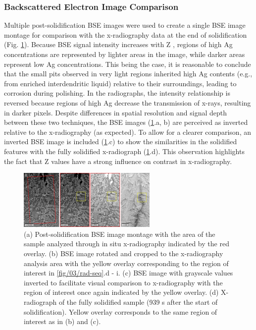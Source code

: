 \subsubsection{Backscattered Electron Image Comparison}
Multiple post-solidification BSE images were used to create a single BSE
image montage for comparison with the x-radiography data at the end of
solidification (Fig. \ref{fig/03/sem-rad}).
Because BSE signal intensity increases with Z \cite{Reuter2003},
regions of high Ag concentrations are represented by lighter areas in the
image, while darker areas represent low Ag concentrations. This being the
case, it is reasonable to conclude that the small pits observed in very
light regions inherited high Ag contents (e.g., from enriched
interdendritic liquid) relative to their surroundings, leading to
corrosion during polishing. In the radiographs, the intensity relationship
is reversed because regions of high Ag decrease the transmission of
x-rays, resulting in darker pixels. Despite differences in spatial
resolution and signal depth between these two techniques, the BSE images
(\ref{fig/03/sem-rad}.a, b) are perceived as inverted relative to the
x-radiography (as expected). To allow for a clearer comparison,
an inverted BSE image is included (\ref{fig/03/sem-rad}.c)
to show the similarities in the solidified features
with the fully solidified x-radiograph (\ref{fig/03/sem-rad}.d).
This observation highlights the fact that Z values have a strong influence on
contrast in x-radiography.

\begin{figure}[ht]
    \centering
    \includegraphics[width=0.6\textwidth]{figures/03/02-sem-rad.png}
    \caption{
        \small{}
        (a) Post-solidification BSE image montage with the area of the
        sample analyzed through in situ x-radiography indicated by the red
        overlay.
        (b) BSE image rotated and cropped to the x-radiography analysis
        area with the yellow overlay corresponding to the region of interest in
        \ref{fig/03/rad-seq}.d - i.
        (c) BSE image with grayscale values inverted to facilitate
        visual comparison to x-radiography with the region of interest once
        again indicated by the yellow overlay.
        (d) X-radiograph of the fully solidified
        sample (939 s after the start of solidification). Yellow overlay
        corresponds to the same region of interest as in (b) and (c).
    }
    \label{fig/03/sem-rad}
\end{figure}

